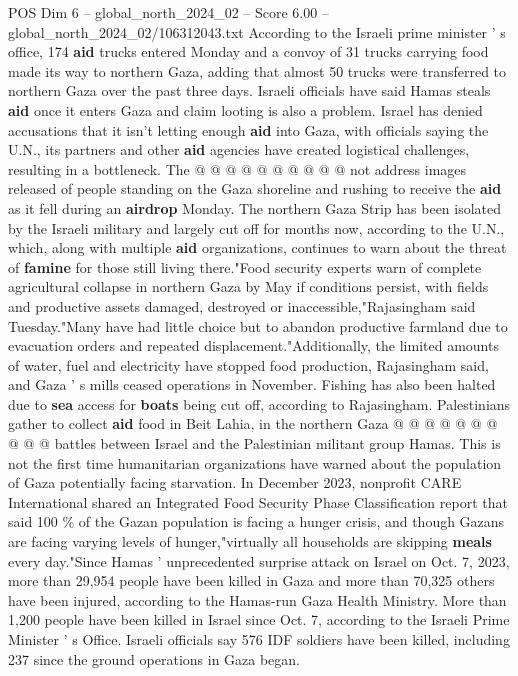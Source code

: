 \begin{textsample}{POS Dim 6 – global\_north\_2024\_02 – Score 6.00 – global\_north\_2024\_02/106312043.txt}
According to the Israeli prime minister ' s office, 174 \textbf{aid} trucks entered Monday and a convoy of 31 trucks carrying food made its way to northern Gaza, adding that almost 50 trucks were transferred to northern Gaza over the past three days.
Israeli officials have said Hamas steals \textbf{aid} once it enters Gaza and claim looting is also a problem.
Israel has denied accusations that it isn't letting enough \textbf{aid} into Gaza, with officials saying the U.N., its partners and other \textbf{aid} agencies have created logistical challenges, resulting in a bottleneck.
The @ @ @ @ @ @ @ @ @ @ not address images released of people standing on the Gaza shoreline and rushing to receive the \textbf{aid} as it fell during an \textbf{airdrop} Monday.
The northern Gaza Strip has been isolated by the Israeli military and largely cut off for months now, according to the U.N., which, along with multiple \textbf{aid} organizations, continues to warn about the threat of \textbf{famine} for those still living there."Food security experts warn of complete agricultural collapse in northern Gaza by May if conditions persist, with fields and productive assets damaged, destroyed or inaccessible,"Rajasingham said Tuesday."Many have had little choice but to abandon productive farmland due to evacuation orders and repeated displacement."Additionally, the limited amounts of water, fuel and electricity have stopped food production, Rajasingham said, and Gaza ' s mills ceased operations in November.
Fishing has also been halted due to \textbf{sea} access for \textbf{boats} being cut off, according to Rajasingham.
Palestinians gather to collect \textbf{aid} food in Beit Lahia, in the northern Gaza @ @ @ @ @ @ @ @ @ @ battles between Israel and the Palestinian militant group Hamas.
This is not the first time humanitarian organizations have warned about the population of Gaza potentially facing starvation.
In December 2023, nonprofit CARE International shared an Integrated Food Security Phase Classification report that said 100 \% of the Gazan population is facing a hunger crisis, and though Gazans are facing varying levels of hunger,"virtually all households are skipping \textbf{meals} every day."Since Hamas ' unprecedented surprise attack on Israel on Oct. 7, 2023, more than 29,954 people have been killed in Gaza and more than 70,325 others have been injured, according to the Hamas-run Gaza Health Ministry.
More than 1,200 people have been killed in Israel since Oct. 7, according to the Israeli Prime Minister ' s Office.
Israeli officials say 576 IDF soldiers have been killed, including 237 since the ground operations in Gaza began.

\end{textsample}
